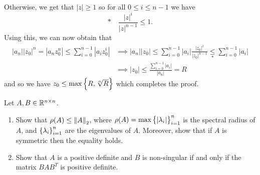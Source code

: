 \documentclass[11pt, a4paper]{article}
\begin{document}
\begin{solution}
\begin{align*}
  \end{align*}
  Otherwise, we get that $|z| \geq 1$ so for all $0 \le i \le n - 1$ we have
  \[
    * \quad \frac{|z|^i}{|z|^{n-1}} \leq 1.
  \]
  Using this, we can now obtain that
  \begin{align*}
      |a_n||z_0|^n = |a_nz_0^n|\leq \sum_{i=0}^{n-1}|a_iz_0^i|
      &\implies
      |a_n||z_0| \leq
      \sum_{i=0}^{n-1}|a_i| \frac{|z_0|^i}{|z_0|^{n-1}} \underset{*}{\leq}
      \sum_{i=0}^{n-1}|a_i| \\
      &\implies
      |z_0| \leq \frac{\sum_{i=0}^{n-1}|a_i|}{|a_n|} = R
  \end{align*}
  and so we have $z_0 \leq \max\left\{R, \sqrt[n]{R}\right\}$ which completes the
  proof.
\end{solution}

\begin{exercise}
  Let $A,B \in \mathbb{R}^{n \times n}$.
  \begin{enumerate}
    \item[(1)] Show that $\rho(A) \le \left\lVert A\right\rVert_2$,
      where $\rho(A) = \max\left\{\left\lvert\lambda_i\right\rvert\right\}_{i=1}^{n}$ is the spectral
      radius of $A$, and $\left\{\lambda_i\right\}_{i=1}^{n}$ are the eigenvalues
      of $A$.
      Moreover, show that if $A$ is symmetric then the equality holds.
    \item[(2)] Show that $A$ is a positive definite and $B$ is non-singular
      if and only if the matrix $B A B^T$ is positive definite.
  \end{enumerate}
\end{exercise}
\end{document}
